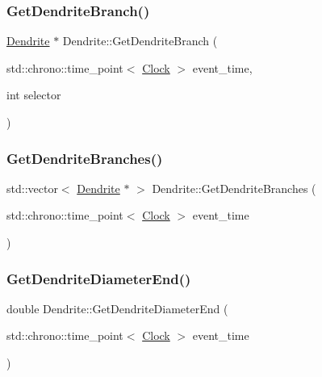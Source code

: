 \mbox{\label{classDendrite_a1465037ca014fa8bbefc8c0ad70d1647}} 
\subsubsection{\texorpdfstring{Get\+Dendrite\+Branch()}{GetDendriteBranch()}}
{\footnotesize\ttfamily \mbox{\hyperlink{classDendrite}{Dendrite}} $\ast$ Dendrite\+::\+Get\+Dendrite\+Branch (\begin{DoxyParamCaption}\item[{std\+::chrono\+::time\+\_\+point$<$ \mbox{\hyperlink{universe_8h_a0ef8d951d1ca5ab3cfaf7ab4c7a6fd80}{Clock}} $>$}]{event\+\_\+time,  }\item[{int}]{selector }\end{DoxyParamCaption})}

\mbox{\label{classDendrite_a00b524d47e3662df712ea060ebadca77}} 
\subsubsection{\texorpdfstring{Get\+Dendrite\+Branches()}{GetDendriteBranches()}}
{\footnotesize\ttfamily std\+::vector$<$ \mbox{\hyperlink{classDendrite}{Dendrite}} $\ast$ $>$ Dendrite\+::\+Get\+Dendrite\+Branches (\begin{DoxyParamCaption}\item[{std\+::chrono\+::time\+\_\+point$<$ \mbox{\hyperlink{universe_8h_a0ef8d951d1ca5ab3cfaf7ab4c7a6fd80}{Clock}} $>$}]{event\+\_\+time }\end{DoxyParamCaption})}

\mbox{\label{classDendrite_a2c46d2612d09964a473e1de99c17fa13}} 
\subsubsection{\texorpdfstring{Get\+Dendrite\+Diameter\+End()}{GetDendriteDiameterEnd()}}
{\footnotesize\ttfamily double Dendrite\+::\+Get\+Dendrite\+Diameter\+End (\begin{DoxyParamCaption}\item[{std\+::chrono\+::time\+\_\+point$<$ \mbox{\hyperlink{universe_8h_a0ef8d951d1ca5ab3cfaf7ab4c7a6fd80}{Clock}} $>$}]{event\+\_\+time }\end{DoxyParamCaption})\hspace{0.3cm}{\ttfamily [inline]}}

